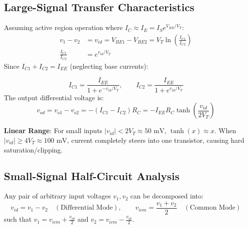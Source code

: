 \documentclass[12pt,a4paper]{article}
\begin{document}
\subsection{Large-Signal Transfer Characteristics}
Assuming active region operation where $I_C \approx I_E = I_S e^{V_{BE}/V_T}$:
\begin{align}
  v_1 - v_2 &= v_{id} = V_{BE1} - V_{BE2} = V_T \ln\left(\frac{I_{C1}}{I_{C2}}\right) \\
  \frac{I_{C1}}{I_{C2}} &= e^{v_{id}/V_T}
\end{align}
Since $I_{C1} + I_{C2} = I_{EE}$ (neglecting base currents):
\begin{tcolorbox}[formulabox, title={Large-Signal Differential Collector Currents}]
\begin{equation}
  I_{C1} = \frac{I_{EE}}{1 + e^{-v_{id}/V_T}}, \qquad I_{C2} = \frac{I_{EE}}{1 + e^{v_{id}/V_T}}
\end{equation}
The output differential voltage is:
\begin{equation}
  v_{od} = v_{o1} - v_{o2} = -(I_{C1} - I_{C2})R_C = -I_{EE} R_C \tanh\left(\frac{v_{id}}{2V_T}\right)
\end{equation}
\end{tcolorbox}
\textbf{Linear Range}: For small inputs $|v_{id}| < 2V_T \approx 50\text{ mV}$, $\tanh(x) \approx x$. When $|v_{id}| \ge 4V_T \approx 100\text{ mV}$, current completely steers into one transistor, causing hard saturation/clipping.

\subsection{Small-Signal Half-Circuit Analysis}
Any pair of arbitrary input voltages $v_1, v_2$ can be decomposed into:
\begin{equation}
  v_{id} = v_1 - v_2 \quad (\text{Differential Mode}), \qquad v_{icm} = \frac{v_1 + v_2}{2} \quad (\text{Common Mode})
\end{equation}
such that $v_1 = v_{icm} + \frac{v_{id}}{2}$ and $v_2 = v_{icm} - \frac{v_{id}}{2}$.
\end{document}
